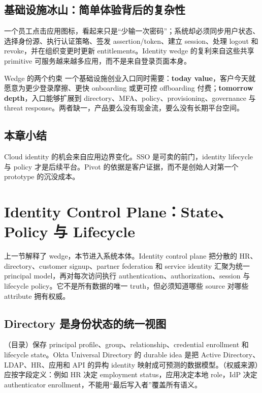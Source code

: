 \documentclass[a4paper]{article}
\begin{document}

\subsection{基础设施冰山：简单体验背后的复杂性}

一个员工点击应用图标，看起来只是“少输一次密码”；系统却必须同步用户状态、选择身份源、执行认证策略、签发 assertion/token、建立 session、处理 logout 和 revoke，并在组织变更时更新 entitlements。Identity wedge 的复利来自这些共享 primitive 可服务越来越多应用，而不是来自登录页面本身。

\begin{importantbox}{Wedge 的两个约束}
一个基础设施创业入口同时需要：\textbf{today value}，客户今天就愿意为更少登录摩擦、更快 onboarding 或更可控 offboarding 付费；\textbf{tomorrow depth}，入口能够扩展到 directory、MFA、policy、provisioning、governance 与 threat response。两者缺一，产品要么没有现金流，要么没有长期平台空间。
\end{importantbox}

\subsection{本章小结}

Cloud identity 的机会来自应用边界变化。SSO 是可卖的前门，identity lifecycle 与 policy 才是后续平台。Pivot 的依据是客户证据，而不是创始人对第一个 prototype 的沉没成本。

\section{Identity Control Plane：State、Policy 与 Lifecycle}

上一节解释了 wedge，本节进入系统本体。Identity control plane 把分散的 HR、directory、customer signup、partner federation 和 service identity 汇聚为统一 principal model，再对每次访问执行 authentication、authorization、session 与 lifecycle policy。它不是所有数据的唯一 truth，但必须知道哪些 source 对哪些 attribute 拥有权威。

\subsection{Directory 是身份状态的统一视图}

（目录）保存 principal profile、group、relationship、credential enrollment 和 lifecycle state。Okta Universal Directory 的 durable idea 是把 Active Directory、LDAP、HR、应用和 API 的异构 identity 映射成可预测的数据模型。（权威来源）应按字段定义：例如 HR 决定 employment status，应用决定本地 role，IdP 决定 authenticator enrollment，不能用“最后写入者”覆盖所有语义。
\end{document}
